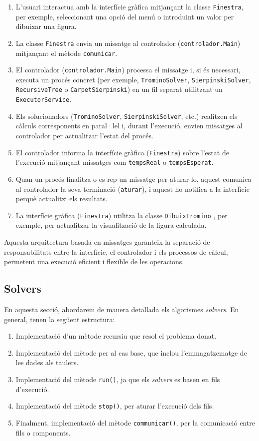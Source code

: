 \documentclass{ieeetj}
\begin{document}
\begin{enumerate}
    \item L'usuari interactua amb la interfície gràfica mitjançant la classe \textsf{\texttt{Finestra}}, per exemple, seleccionant una opció del menú o introduint un valor per dibuixar una figura.
    \item La classe \texttt{Finestra} envia un missatge al controlador (\texttt{controlador.Main}) mitjançant el mètode \texttt{comunicar}.
    \item El controlador (\texttt{controlador.Main}) processa el missatge i, si és necessari, executa un procés concret (per exemple, \texttt{TrominoSolver}, \texttt{SierpinskiSolver}, \texttt{RecursiveTree} o \texttt{CarpetSierpinski}) en un fil separat utilitzant un \texttt{ExecutorService}.
    \item Els solucionadors (\texttt{TrominoSolver}, \texttt{SierpinskiSolver}, etc.) realitzen els càlculs corresponents en paral·lel i, durant l'execució, envien missatges al controlador per actualitzar l'estat del procés.
    \item El controlador informa la interfície gràfica (\texttt{Finestra}) sobre l'estat de l'execució mitjançant missatges com \texttt{tempsReal} o \texttt{tempsEsperat}.
    \item Quan un procés finalitza o es rep un missatge per aturar-lo, aquest comunica al controlador la seva terminació (\texttt{aturar}), i aquest ho notifica a la interfície perquè actualitzi els resultats.
    \item La interfície gràfica (\texttt{Finestra}) utilitza la classe \texttt{DibuixTromino} , per exemple, per actualitzar la visualització de la figura calculada.
\end{enumerate}

Aquesta arquitectura basada en missatges garanteix la separació de responsabilitats entre la interfície, el controlador i els processos de càlcul, permetent una execució eficient i flexible de les operacions.

\subsection{Solvers}
En aquesta secció, abordarem de manera detallada els algorismes \textit{solvers}. En general, tenen la següent estructura:

\begin{enumerate}
    \item Implementació d'un mètode recursiu que resol el problema donat.
    \item Implementació del mètode per al cas base, que inclou l'emmagatzematge de les dades als taulers.
    \item Implementació del mètode \texttt{run()}, ja que els \textit{solvers} es basen en fils d'execució.
    \item Implementació del mètode \texttt{stop()}, per aturar l'execució dels fils.
    \item Finalment, implementació del mètode \texttt{communicar()}, per la comunicació entre fils o components.
\end{enumerate}
\end{document}
